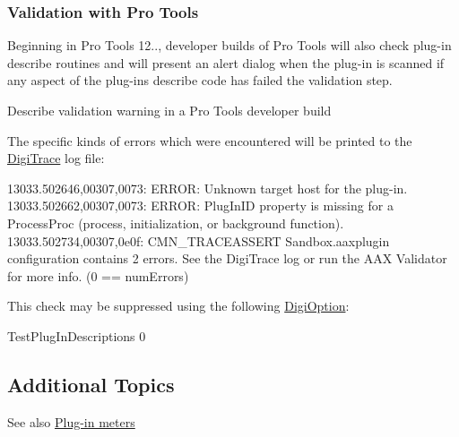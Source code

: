 \hypertarget{a00326_describe_validation_protools}{}\subsubsection{Validation with Pro Tools}\label{a00326_describe_validation_protools}
 Beginning in Pro Tools 12.., developer builds of Pro Tools will also check plug-\/in describe routines and will present an alert dialog when the plug-\/in is scanned if any aspect of the plug-\/in\textquotesingle{}s describe code has failed the validation step.

   Describe validation warning in a Pro Tools developer build

 The specific kinds of errors which were encountered will be printed to the \hyperlink{a00364}{Digi\+Trace} log file\+:

\begin{DoxyVerb}13033.502646,00307,0073: ERROR: Unknown target host for the plug-in.
13033.502662,00307,0073: ERROR: PlugInID property is missing for a ProcessProc (process, initialization, or background function).
13033.502734,00307,0e0f: CMN_TRACEASSERT  Sandbox.aaxplugin configuration contains 2 errors. See the DigiTrace log or run the AAX Validator for more info. (0 == numErrors)\end{DoxyVerb}


 This check may be suppressed using the following \hyperlink{a00360_aax_pro_tools_guide_06c_digioptions}{Digi\+Option}\+:

 {\ttfamily Test\+Plug\+In\+Descriptions 0}



 \hypertarget{a00326_describe_additionaltopics}{}\subsection{Additional Topics}\label{a00326_describe_additionaltopics}
 \begin{DoxySeeAlso}{See also}
\hyperlink{a00337}{Plug-\/in meters}
\end{DoxySeeAlso}
